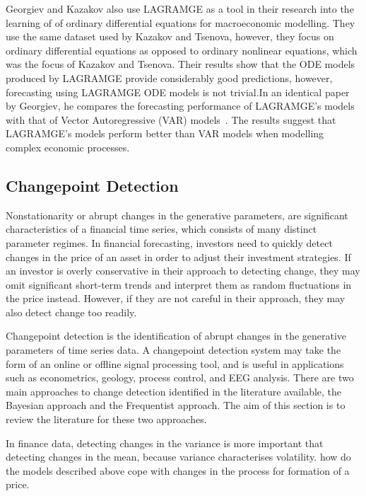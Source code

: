 \documentclass[13pt]{report}
\begin{document}
Georgiev and Kazakov also use LAGRAMGE as a tool in their research into the learning of of ordinary differential equations for macroeconomic modelling\cite{georgiev2015learning}. They use the same dataset used by Kazakov and Tsenova, however, they focus on ordinary differential equations as opposed to ordinary nonlinear equations, which was the focus of Kazakov and Tsenova. Their results show that the ODE models produced by LAGRAMGE provide considerably good predictions, however, forecasting using LAGRAMGE ODE models is not trivial.In an identical paper by Georgiev, he compares the forecasting performance of LAGRAMGE's models with that of Vector Autoregressive (VAR) models~\cite{georgiev2015learning2}. The results suggest that LAGRAMGE's models perform better than VAR models when modelling complex economic processes.  

\subsection{Changepoint Detection}
Nonstationarity or abrupt changes in the generative parameters, are significant characteristics of a financial time series, which consists of many distinct parameter regimes\cite{turner2009adaptive}. In financial forecasting, investors need to quickly detect changes in the price of an asset  in order to adjust their investment strategies. If an investor is overly conservative in their approach to detecting change, they may omit significant short-term trends and interpret them as random fluctuations in the price instead\cite{steyvers2005prediction}. However, if they are not careful in their approach, they may also detect change too readily\cite{steyvers2005prediction}. 

Changepoint detection is the identification of abrupt changes in the generative parameters of time series data\cite{adams2007bayesian}. A changepoint detection system may take the form of an online or offline signal processing tool, and is useful in applications such as econometrics, geology, process control, and EEG analysis. There are two main approaches to change detection identified in the literature available, the Bayesian approach and the Frequentist approach. The aim of this section is to review the literature for these two approaches.  

In finance data, detecting changes in the variance is more important that detecting changes in the mean, because variance characterises volatility.
how do the models described above cope with changes in the process for formation of a price.
\end{document}
